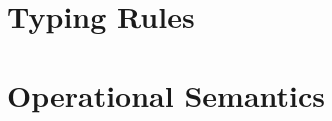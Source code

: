 \documentclass[11pt]{article}%
\begin{document}
%

\section{Typing Rules}
\ottdefnsTypes%
\clearpage%

\section{Operational Semantics}
\ottdefnsOpXXSem%
\clearpage%


\clearpage%


\clearpage%
\end{document}
